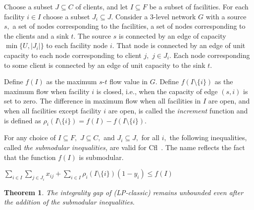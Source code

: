 \documentclass[11pt]{article}
\newtheorem{theorem}{Theorem}[section]
\newcommand{\cfl}{{\sc Cfl}}
\begin{document}
Choose a subset $J\subseteq C$ of  clients, and let $I \subseteq F$ be
a subset  of facilities.  For each  facility $i\in I$  choose a subset
$J_i \subseteq J$.  Consider a 3-level network $G$ with a source $s,$ a set of
nodes corresponding to the facilities, a set of nodes corresponding
to the clients and a sink $t$. The source $s$ is connected by an edge of capacity
$\min\{U, |J_i|\}$ to each facility node $i.$ That node 
 is connected by an  edge of unit
capacity to each node corresponding to client $j,$ $j\in J_i$.
Each node corresponding to some client is connected by an edge of unit
capacity to the sink $t$.


Define   $f(I)$ as the maximum $s$-$t$ flow value in $G.$ 
Define $f(I\setminus\{i\})$ as the maximum flow when facility $i$ is
closed, i.e., when the
capacity of edge $(s,i)$ is set to zero. 
The difference in maximum flow when all facilities in $I$
are open, and when all facilities except facility $i$ are open, is
called the 
{\em increment}
function and is defined as $\rho_i(I \setminus \{i\}) = f(I) - f(I
\setminus \{i\})$.

For any choice of $I \subseteq F,$ $J\subseteq C,$ and $J_i \subseteq
J,$ for all $i,$ the following inequalities, 
 called \emph{the submodular inequalities,} are valid for
 \cfl\ \cite{AardalPW95}. The name reflects the fact that the function
 $f(I)$ is submodular. 

\begin{center}
$\sum_{i\in I}\sum_{j\in J_i}x_{ij}+\sum_{i\in I}\rho_i(I\setminus \{i\})(1-y_i) \leq f(I)$
\end{center}

\begin{theorem}  \label{thm:submod} 
The integrality gap of (LP-classic) remains unbounded even after the addition of the submodular inequalities.  
\end{theorem}
\end{document}

